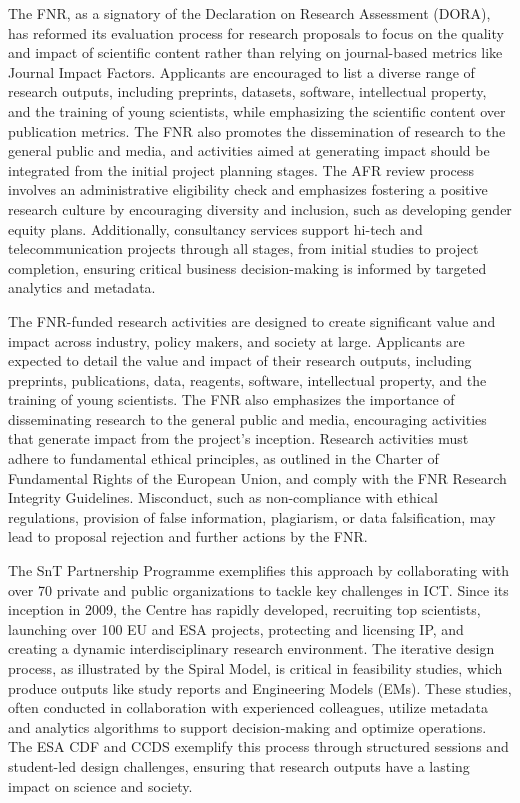 \documentclass[12pt]{article}
\begin{document}
The FNR, as a signatory of the Declaration on Research Assessment (DORA), has reformed its evaluation process for research proposals to focus on the quality and impact of scientific content rather than relying on journal-based metrics like Journal Impact Factors. Applicants are encouraged to list a diverse range of research outputs, including preprints, datasets, software, intellectual property, and the training of young scientists, while emphasizing the scientific content over publication metrics. The FNR also promotes the dissemination of research to the general public and media, and activities aimed at generating impact should be integrated from the initial project planning stages. The AFR review process involves an administrative eligibility check and emphasizes fostering a positive research culture by encouraging diversity and inclusion, such as developing gender equity plans. Additionally, consultancy services support hi-tech and telecommunication projects through all stages, from initial studies to project completion, ensuring critical business decision-making is informed by targeted analytics and metadata.

The FNR-funded research activities are designed to create significant value and impact across industry, policy makers, and society at large. Applicants are expected to detail the value and impact of their research outputs, including preprints, publications, data, reagents, software, intellectual property, and the training of young scientists. The FNR also emphasizes the importance of disseminating research to the general public and media, encouraging activities that generate impact from the project's inception. Research activities must adhere to fundamental ethical principles, as outlined in the Charter of Fundamental Rights of the European Union, and comply with the FNR Research Integrity Guidelines. Misconduct, such as non-compliance with ethical regulations, provision of false information, plagiarism, or data falsification, may lead to proposal rejection and further actions by the FNR.

The SnT Partnership Programme exemplifies this approach by collaborating with over 70 private and public organizations to tackle key challenges in ICT. Since its inception in 2009, the Centre has rapidly developed, recruiting top scientists, launching over 100 EU and ESA projects, protecting and licensing IP, and creating a dynamic interdisciplinary research environment. The iterative design process, as illustrated by the Spiral Model, is critical in feasibility studies, which produce outputs like study reports and Engineering Models (EMs). These studies, often conducted in collaboration with experienced colleagues, utilize metadata and analytics algorithms to support decision-making and optimize operations. The ESA CDF and CCDS exemplify this process through structured sessions and student-led design challenges, ensuring that research outputs have a lasting impact on science and society.
\end{document}
